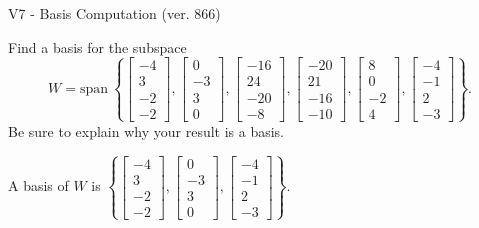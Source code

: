 \begin{exercise}
  \begin{exerciseTitle}V7 - Basis Computation (ver. 866)\end{exerciseTitle}
  \begin{exerciseStatement}
    Find a basis for the subspace 
\[W=\mathrm{span}\ \left\{\left[\begin{array}{r}
-4 \\
3 \\
-2 \\
-2
\end{array}\right] , \left[\begin{array}{r}
0 \\
-3 \\
3 \\
0
\end{array}\right] , \left[\begin{array}{r}
-16 \\
24 \\
-20 \\
-8
\end{array}\right] , \left[\begin{array}{r}
-20 \\
21 \\
-16 \\
-10
\end{array}\right] , \left[\begin{array}{r}
8 \\
0 \\
-2 \\
4
\end{array}\right] , \left[\begin{array}{r}
-4 \\
-1 \\
2 \\
-3
\end{array}\right]\right\}.\]
 Be sure to explain why your result is a basis.


  \end{exerciseStatement}
  \begin{exerciseAnswer}
   A basis of \(W\) is  \(\left\{\left[\begin{array}{r}
-4 \\
3 \\
-2 \\
-2
\end{array}\right] , \left[\begin{array}{r}
0 \\
-3 \\
3 \\
0
\end{array}\right] , \left[\begin{array}{r}
-4 \\
-1 \\
2 \\
-3
\end{array}\right]\right\}\).
  


  \end{exerciseAnswer}
\end{exercise}